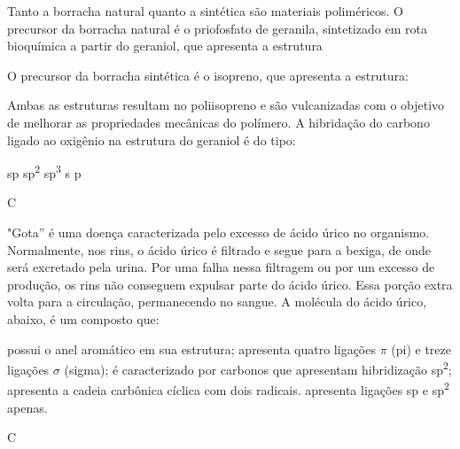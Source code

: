 \documentclass[10pt]{scrartcl}
\begin{document}
\begin{exercise}[points=1]
Tanto a borracha natural quanto a sintética são materiais poliméricos. O precursor da borracha natural é o priofosfato de geranila, sintetizado em rota bioquímica a partir do geraniol, que apresenta a estrutura

\begin{center}
\end{center}

O precursor da borracha sintética é o isopreno, que apresenta a estrutura:

\begin{center}
\end{center}

Ambas as estruturas resultam no poliisopreno e são vulcanizadas com o objetivo de melhorar as propriedades mecânicas do polímero. A hibridação do carbono ligado ao oxigênio na estrutura do geraniol é do tipo:

\begin{choice}
\choice sp
\choice sp\textsuperscript{2}
\choice sp\textsuperscript{3}
\choice s
\choice p
\end{choice}
\end{exercise}
\begin{solution}
C
\end{solution}






\begin{exercise}[points=1]
"Gota” é uma doença caracterizada pelo excesso de ácido úrico no organismo. Normalmente, nos rins, o ácido úrico é filtrado e segue para a bexiga, de onde será excretado pela urina. Por uma falha nessa filtragem ou por um excesso de produção, os rins não conseguem expulsar parte do ácido úrico. Essa porção extra volta para a circulação, permanecendo no sangue. A molécula do ácido úrico, abaixo, é um composto que:

\begin{center}
\end{center}
\begin{choice}
\choice possui o anel aromático em sua estrutura;
\choice apresenta quatro ligações \(\pi\) (pi) e treze ligações \(\sigma\) (sigma);
\choice é caracterizado por carbonos que apresentam hibridização sp\textsuperscript{2};
\choice apresenta a cadeia carbônica cíclica com dois radicais.
\choice apresenta ligações sp e sp\textsuperscript{2} apenas.
\end{choice}
\end{exercise}
\begin{solution}
C
\end{solution}
\end{document}
